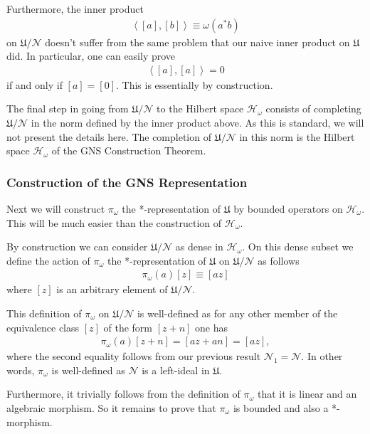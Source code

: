 Furthermore, the inner product
\begin{align}
    \left<[a], [b]\right> \equiv \omega(a^*b)
\end{align}
on $\mathfrak{U} / \mathcal{N}$ doesn't suffer from the same problem that our naive inner product on $\mathfrak{U}$ did. In particular, one can easily prove
\begin{align}
    \left<[a], [a]\right> = 0
\end{align}
if and only if $[a] = [0]$. This is essentially by construction.

The final step in going from $\mathfrak{U} / \mathcal{N}$ to the Hilbert space $\mathcal{H}_\omega$ consists of completing $\mathfrak{U} / \mathcal{N}$ in the norm defined by the inner product above. As this is standard, we will not present the details here. The completion of $\mathfrak{U} / \mathcal{N}$ in this norm is the Hilbert space $\mathcal{H}_\omega$ of the GNS Construction Theorem.

\subsubsection{Construction of the GNS Representation}
Next we will construct $\pi_\omega$ the *-representation of $\mathfrak{U}$ by bounded operators on $\mathcal{H}_\omega$. This will be much easier than the construction of $\mathcal{H}_\omega$.

By construction we can consider $\mathfrak{U} / \mathcal{N}$ as dense in $\mathcal{H}_\omega$. On this dense subset we define the action of $\pi_\omega$ the *-representation of $\mathfrak{U}$ on $\mathfrak{U} / \mathcal{N}$ as follows
\begin{align}
    \pi_\omega(a)[z] \equiv [az]
\end{align}
where $[z]$ is an arbitrary element of $\mathfrak{U} / \mathcal{N}$.

This definition of $\pi_\omega$ on $\mathfrak{U} / \mathcal{N}$ is well-defined as for any other member of the equivalence class $[z]$ of the form $[z + n]$ one has
\begin{align}
    \pi_\omega(a)[z + n] = [az + an] = [az],
\end{align}
where the second equality follows from our previous result $\mathcal{N}_1 = \mathcal{N}$. In other words, $\pi_\omega$ is well-defined as $\mathcal{N}$ is a left-ideal in $\mathfrak{U}$.

Furthermore, it trivially follows from the definition of $\pi_\omega$ that it is linear and an algebraic morphism. So it remains to prove that $\pi_\omega$ is bounded and also a *-morphism.

